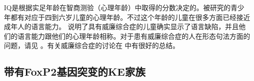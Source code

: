 IQ是根据实足年龄在智商测验（心理年龄）中取得的分数决定的。被研究的青少年都有对应于四到六岁儿童的心理年龄。不过这个年龄的儿童在很多方面已经接近成年人的语言能力。 \citet*[]{GSP94a}说明了具有威廉综合症的儿童确实显示了语言缺陷，并且他们的语言能力跟他们的心理年龄相称。对于患有威廉综合症的人在形态句法方面的问题，请见 。有关威廉综合症的讨论在 中有很好的总结。

\subsection{带有FoxP2基因突变的KE家族}

